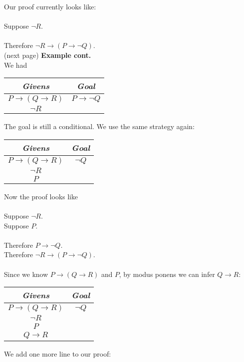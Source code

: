 \documentclass{report}
\theoremstyle{definition}
\begin{document}
Our proof currently looks like:\\
\vspace{1mm}\\
\indent Suppose $\neg R$.\\
\indent{}\\
\indent Therefore $\neg R\to(P\to\neg Q)$.\\
(next page)\newpage
\noindent\textbf{Example cont.}\\
We had
\begin{center}
\begin{tabular}{c|c}
\textit{Givens}&\textit{Goal}\\
\hline
$P\to(Q\to R)$&$P\to\neg Q$\\
$\neg R$&
\end{tabular}
\end{center}
The goal is still a conditional. We use the same strategy again:
\begin{center}
\begin{tabular}{c|c}
\textit{Givens}&\textit{Goal}\\
\hline
$P\to(Q\to R)$&$\neg Q$\\
$\neg R$&\\
$P$&
\end{tabular}
\end{center}
Now the proof looks like\\
\vspace{1mm}\\
\indent Suppose $\neg R$.\\
\indent\indent Suppose $P$.\\
\indent\indent{}\\
\indent\indent Therefore $P\to\neg Q$.\\
\indent Therefore $\neg R\to(P\to\neg Q)$.\\
\vspace{1mm}\\
Since we know $P\to(Q\to R)$ and $P$, by modus ponens we can infer $Q\to R$:
\begin{center}
\begin{tabular}{c|c}
\textit{Givens}&\textit{Goal}\\
\hline
$P\to(Q\to R)$&$\neg Q$\\
$\neg R$&\\
$P$&\\
$Q\to R$&
\end{tabular}
\end{center}
We add one more line to our proof:\\
\end{document}
